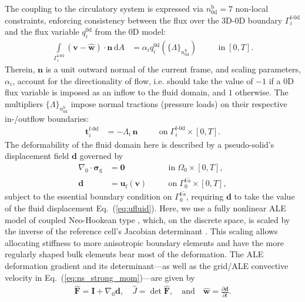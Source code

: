 The coupling to the circulatory system is expressed via $n_{\mathrm{0d}}^{\mathrm{b}}=7$ non-local constraints, enforcing consistency between the flux over the 3D-0D boundary $\mathit{\Gamma}_{i}^{\mathrm{f}\text{-}\mathrm{0d}}$ and the flux variable $q_{i}^{\mathrm{0d}}$ from the 0D model:
\begin{align}
    \int\limits_{\mathit{\Gamma}_{i}^{\mathrm{f}\text{-}\mathrm{0d}}} (\boldsymbol{v}-\widehat{\boldsymbol{w}})\cdot\boldsymbol{n}\,\mathrm{d}A &= \alpha_{i} q_{i}^{\mathrm{0d}}(\{\mathit{\Lambda}\}_{n_{\mathrm{0d}}^{\mathrm{b}}}) \quad &&\text{in} \; [0,T]. \label{eq:3d0d_constraint}
\end{align}
Therein, $\boldsymbol{n}$ is a unit outward normal of the current frame, and scaling parameters, $\alpha_i$, account for the directionality of flow, i.e. should take the value of $-1$ if a 0D flux variable is imposed as an inflow to the fluid domain, and $1$ otherwise. The multipliers $\{\mathit{\Lambda}\}_{n_{\mathrm{0d}}^{\mathrm{b}}}$ impose normal tractions (pressure loads) on their respective in-/outflow boundaries:
\begin{align}
    \boldsymbol{t}_{i}^{\mathrm{\mathrm{f}\text{-}\mathrm{0d}}} &= -\mathit{\Lambda}_{i} \,\boldsymbol{n} \quad &&\text{on} \; \mathit{\Gamma}_{i}^{\mathrm{f}\text{-}\mathrm{0d}} \times [0,T]. \label{eq:frsi_t0d_gen}
\end{align}
The deformability of the fluid domain here is described by a pseudo-solid's displacement field $\boldsymbol{d}$ governed by 
\begin{align}
    \nabla_{0}\cdot \boldsymbol{\sigma}_{\mathrm{g}} &= \boldsymbol{0} \quad &&\text{in} \;\mathit{\Omega}_{0} \times [0,T], \label{eq:ale_strong_gen}\\
    \boldsymbol{d} &= \boldsymbol{u}_{\mathrm{f}}(\boldsymbol{v}) 
    \quad &&  
    \text{on}\; \mathit{\Gamma}_{0}^{\mathrm{f}\text{-}\tilde{\mathrm{s}}} \times [0,T], \label{eq:ale_dbc_gen}
\end{align}
subject to the essential boundary condition on $\mathit{\Gamma}_{0}^{\mathrm{f}\text{-}\tilde{\mathrm{s}}}$, requiring $\boldsymbol{d}$ to take the value of the fluid displacement Eq.~(\ref{eq:ufluid}). Here, we use a fully nonlinear ALE model of coupled Neo-Hookean type \cite{holzapfel2000}, which, on the discrete space, is scaled by the inverse of the reference cell's Jacobian determinant \cite{shamanskiy2021}. This scaling allows allocating stiffness to more anisotropic boundary elements and have the more regularly shaped bulk elements bear most of the deformation. The ALE deformation gradient and its determinant---as well as the grid/ALE convective velocity in Eq.~(\ref{eq:ns_strong_mom})---are given by
\begin{align}
    \widehat{\boldsymbol{F}}=\boldsymbol{I}+\nabla_{0}\boldsymbol{d}, \quad \widehat{J}=\det\widehat{\boldsymbol{F}}, \quad \text{and} \quad \widehat{\boldsymbol{w}}=\frac{\partial\boldsymbol{d}}{\partial t}.
    \label{eq:defgrad_ale}
\end{align}


